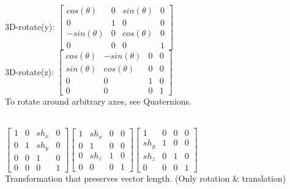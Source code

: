 3D-rotate(y):
$\begin{bmatrix}
        cos(\theta) & 0 & sin(\theta) & 0 \\
        0 & 1 & 0 & 0 \\
        -sin(\theta) & 0 & cos(\theta) & 0\\
        0 & 0 & 0 & 1
\end{bmatrix}$\\
3D-rotate(z):
$\begin{bmatrix}
        cos(\theta) & -sin(\theta) & 0 & 0 \\
        sin(\theta) & cos(\theta) & 0 & 0 \\
        0 & 0 & 1 & 0\\
        0 & 0 & 0 & 1
\end{bmatrix}$\\
To rotate around arbitrary axes, see Quaternions. 

\\
$
\begin{bmatrix}
    1 & 0 & sh_x & 0 \\
    0 & 1 & sh_y & 0 \\
    0 & 0 & 1 & 0 \\
    0 & 0 & 0 & 1
\end{bmatrix}
$$
\begin{bmatrix}
    1 & sh_x & 0 & 0 \\
    0 & 1 & 0 & 0 \\
    0 & sh_z & 1 & 0 \\
    0 & 0 & 0 & 1
\end{bmatrix}
$$
\begin{bmatrix}
    1 & 0 & 0 & 0 \\
    sh_y & 1 & 0 & 0 \\
    sh_z & 0 & 1 & 0 \\
    0 & 0 & 0 & 1
\end{bmatrix}
$\\
Transformation that preserves vector length. (Only rotation \& translation)

